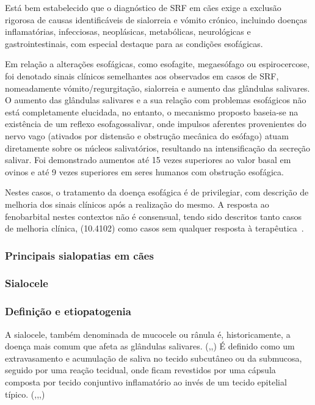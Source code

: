 Está bem estabelecido que o diagnóstico de SRF em cães exige a exclusão rigorosa de causas identificáveis de sialorreia e vómito crónico, incluindo doenças inflamatórias, infecciosas, neoplásicas, metabólicas, neurológicas e gastrointestinais, com especial destaque para as condições esofágicas. 


Em relação a alterações esofágicas, como esofagite, megaesófago ou espirocercose, foi denotado sinais clínicos semelhantes \cite{Han2016} aos observados em casos de SRF, nomeadamente vómito/regurgitação, sialorreia e aumento das glândulas salivares. O aumento das glândulas salivares e a sua relação com problemas esofágicos não está completamente elucidada, no entanto, o mecanismo proposto baseia-se na existência de um reflexo esofagossalivar, onde impulsos aferentes provenientes do nervo vago (ativados por distensão e obstrução mecânica do esófago) atuam diretamente sobre os núcleos salivatórios, resultando na intensificação da secreção salivar. Foi demonstrado aumentos até 15 vezes superiores ao valor basal em ovinos e até 9 vezes superiores em seres humanos com obstrução esofágica.


Nestes casos, o tratamento da doença esofágica é de privilegiar, com descrição de melhoria dos sinais clínicos após a realização do mesmo. A resposta ao fenobarbital nestes contextos não é consensual, tendo sido descritos tanto casos de melhoria clínica, (10.4102) como casos sem qualquer resposta à terapêutica~\cite{Walton-Clark2022,gibbon_phenobarbital-responsive_german_2004}.

\subsubsection{Principais sialopatias em cães}
\subsubsection{Sialocele}
\subsubsection{Definição e etiopatogenia}

A sialocele, também denominada de mucocele ou rânula é, historicamente, a doença  mais comum que afeta as glândulas salivares. (\cite{deLaPuerta2020},\cite{Cinti2021},\cite{Olimpo2023}) É definido como um extravasamento e acumulação de saliva no tecido subcutâneo ou da submucosa, seguido por uma reação tecidual, onde ficam revestidos por uma cápsula composta por tecido conjuntivo inflamatório ao invés de um tecido epitelial típico. (\cite{Zadeh2025},\cite{rfeu},\cite{Bae2024},\cite{sa_})


